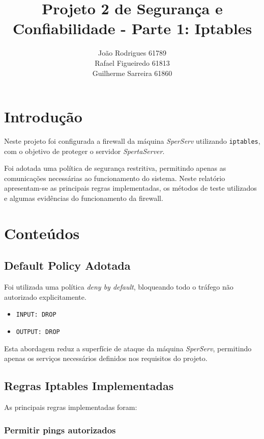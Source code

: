 \documentclass{article}
\title{Projeto 2 de Segurança e Confiabilidade - Parte 1: Iptables}
\author{João Rodrigues 61789 \\ Rafael Figueiredo 61813 \\ Guilherme Sarreira 61860}
\date{}
\begin{document}
\maketitle

\section{Introdução}

Neste projeto foi configurada a firewall da máquina \textit{SperServ} utilizando \texttt{iptables}, com o objetivo de proteger o servidor \textit{SpertaServer}.  

Foi adotada uma política de segurança restritiva, permitindo apenas as comunicações necessárias ao funcionamento do sistema. Neste relatório apresentam-se as principais regras implementadas, os métodos de teste utilizados e algumas evidências do funcionamento da firewall.

\section{Conteúdos}

\subsection{Default Policy Adotada}

Foi utilizada uma política \textit{deny by default}, bloqueando todo o tráfego não autorizado explicitamente.

\begin{itemize}
    \item \texttt{INPUT: DROP}
    \item \texttt{OUTPUT: DROP}
\end{itemize}

Esta abordagem reduz a superfície de ataque da máquina \textit{SperServ}, permitindo apenas os serviços necessários definidos nos requisitos do projeto.

\subsection{Regras Iptables Implementadas}

As principais regras implementadas foram:

\subsubsection{Permitir pings autorizados}
\end{document}
